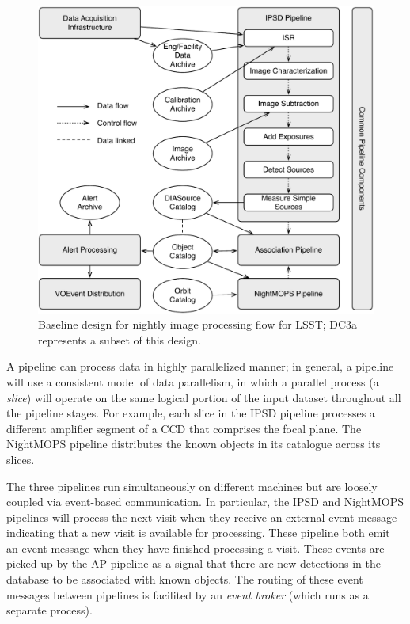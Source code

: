 \begin{itemize}
\begin{figure}[t]
\begin{center}
\includegraphics[width=4.5in]{images/LSSTpipes.pdf}
\caption{Baseline design for nightly image processing flow for LSST; DC3a represents
a subset of this design.  
\label{fig:lsstpipes}}
\end{center}
\end{figure}


\end{itemize}

A pipeline can process data in highly parallelized manner; in general,
a pipeline will use a consistent model of data parallelism, in which a
parallel process (a \textit{slice}) will operate on the same logical
portion of the input dataset throughout all the pipeline stages.  For
example, each slice in the IPSD pipeline processes a different
amplifier segment of a CCD that comprises the focal plane.  The
NightMOPS pipeline distributes the known objects in its catalogue
across its slices.  

The three pipelines run simultaneously on different machines but are
loosely coupled via event-based communication.  In particular, the
IPSD and NightMOPS pipelines will process the next visit when they
receive an external event message indicating that a new visit is
available for processing.  These pipeline both emit an event message
when they have finished processing a visit.  These events are picked
up by the AP pipeline as a signal that there are new detections in the
database to be associated with known objects.  The routing of these
event messages between pipelines is facilited by an \textit{event
broker} (which runs as a separate process).  

